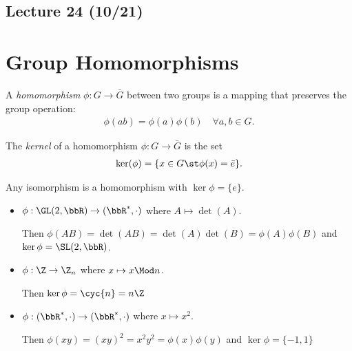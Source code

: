 
\subsection*{Lecture 24 (10/21)} %
\section{Group Homomorphisms} %

\begin{definition}[homomorphism]
  A \emph{homomorphism} \(\phi: G\to \bar G\) between two groups is a mapping that preserves the group operation:
  \begin{align*}
      \phi(ab) = \phi(a)\phi(b)\quad \forall a,b\in G.
  \end{align*}
  \end{definition}

  \begin{definition}[kernel]
  The \emph{kernel} of a homomorphism \(\phi: G\to \bar G\) is the set
      \begin{align*}
          \ker(\phi) = \{x\in G \st \phi(x)=\bar e\}.
      \end{align*}
  \end{definition}

  \begin{example}
      Any isomorphism is a homomorphism with \(\ker\phi=\{e\}\).
  \end{example}

  \begin{examples}
  \begin{itemize}
      \item \(\phi:\GL(2,\bbR)\to (\bbR^*, \cdot)\) where \(A\mapsto \det(A)\).

      Then \(\phi(AB) = \det(AB) = \det(A)\det(B) = \phi(A)\phi(B)\) and \(\ker\phi = \SL(2,\bbR)\).

      \item \(\phi: \Z \to \Z_n\) where \(x\mapsto x\Mod n\).

      Then \(\ker\phi = \cyc{n} = n\Z\)

      \item \(\phi: (\bbR^*, \cdot)\to (\bbR^*, \cdot)\) where \(x\mapsto x^2\).

      Then \(\phi(xy)=(xy)^2 = x^2y^2=\phi(x)\phi(y)\) and \(\ker\phi = \{-1, 1\}\)
  \end{itemize}
  \end{examples}

